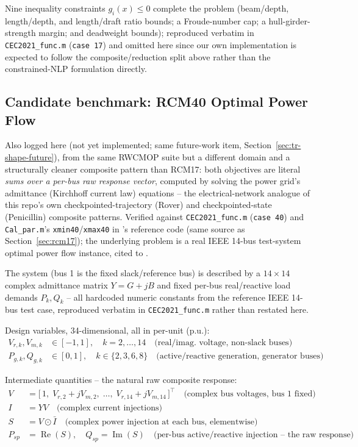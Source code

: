 \documentclass[11pt]{article}
\begin{document}
Nine inequality constraints $g_i(x) \le 0$ complete the problem (beam/depth,
length/depth, and length/draft ratio bounds; a Froude-number cap; a
hull-girder-strength margin; and deadweight bounds); reproduced verbatim in
\texttt{CEC2021\_func.m} (\texttt{case 17}) and omitted here since our own
implementation is expected to follow the composite/reduction split above
rather than the constrained-NLP formulation directly.

\subsection{Candidate benchmark: RCM40 Optimal Power Flow}
\label{sec:rcm40}

Also logged here (not yet implemented; same future-work item,
Section~\ref{sec:tr-shape-future}), from the same RWCMOP suite but a
different domain and a structurally cleaner composite pattern than RCM17:
both objectives are literal \emph{sums over a per-bus raw response vector},
computed by solving the power grid's admittance (Kirchhoff current law)
equations -- the electrical-network analogue of this repo's own
checkpointed-trajectory (Rover) and checkpointed-state (Penicillin)
composite patterns. Verified against \texttt{CEC2021\_func.m}
(\texttt{case 40}) and \texttt{Cal\_par.m}'s \texttt{xmin40}/\texttt{xmax40}
in \citep{kumar2021rwcmop}'s reference code (same source as
Section~\ref{sec:rcm17}); the underlying problem is a real IEEE 14-bus
test-system optimal power flow instance, cited to
\citet{biswas2020opf}.

The system (bus 1 is the fixed slack/reference bus) is described by a
$14\times14$ complex admittance matrix $Y = G + jB$ and fixed per-bus
real/reactive load demands $P_k, Q_k$ -- all hardcoded numeric constants
from the reference IEEE 14-bus test case, reproduced verbatim in
\texttt{CEC2021\_func.m} rather than restated here.

Design variables, 34-dimensional, all in per-unit (p.u.):
\begin{align}
V_{r,k}, V_{m,k} &\in [-1, 1], \quad k = 2, \ldots, 14 \quad \text{(real/imag. voltage, non-slack buses)} \\
P_{g,k}, Q_{g,k} &\in [0, 1], \quad k \in \{2, 3, 6, 8\} \quad \text{(active/reactive generation, generator buses)}
\end{align}

Intermediate quantities -- the natural raw composite response:
\begin{align}
V &= \big[\,1,\; V_{r,2}{+}jV_{m,2},\; \ldots,\; V_{r,14}{+}jV_{m,14}\,\big]^\top \quad \text{(complex bus voltages, bus 1 fixed)} \\
I &= Y V \quad \text{(complex current injections)} \\
S &= V \odot \bar{I} \quad \text{(complex power injection at each bus, elementwise)} \\
P_{sp} &= \operatorname{Re}(S), \quad Q_{sp} = \operatorname{Im}(S) \quad \text{(per-bus active/reactive injection -- the raw response)}
\end{align}
\end{document}
